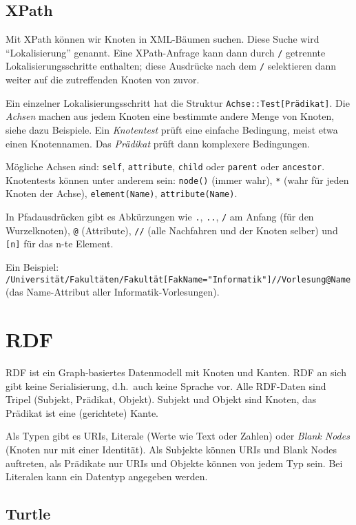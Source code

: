\documentclass[a4paper,parskip=half*,DIV=15,fontsize=11pt]{scrartcl}
\begin{document}
\subsection{XPath}

Mit XPath können wir Knoten in XML-Bäumen suchen. Diese Suche wird ``Lokalisierung'' genannt. Eine XPath-Anfrage kann dann durch \lstinline{/} getrennte Lokalisierungsschritte enthalten; diese Ausdrücke nach dem \lstinline{/} selektieren dann weiter auf die zutreffenden Knoten von zuvor.

Ein einzelner Lokalisierungsschritt hat die Struktur \lstinline{Achse::Test[Prädikat]}. Die \emph{Achsen} machen aus jedem Knoten eine bestimmte andere Menge von Knoten, siehe dazu Beispiele. Ein \emph{Knotentest} prüft eine einfache Bedingung, meist etwa einen Knotennamen. Das \emph{Prädikat} prüft dann komplexere Bedingungen.

Mögliche Achsen sind: \lstinline{self}, \lstinline{attribute}, \lstinline{child} oder \lstinline{parent} oder \lstinline{ancestor}. Knotentests können unter anderem sein: \lstinline{node()} (immer wahr), \lstinline{*} (wahr für jeden Knoten der Achse), \lstinline{element(Name)}, \lstinline{attribute(Name)}.

In Pfadausdrücken gibt es Abkürzungen wie \lstinline{.}, \lstinline{..}, \lstinline{/} am Anfang (für den Wurzelknoten), \lstinline{@} (Attribute), \lstinline{//} (alle Nachfahren und der Knoten selber) und \lstinline{[n]} für das n-te Element.

Ein Beispiel: \lstinline{/Universität/Fakultäten/Fakultät[FakName="Informatik"]//Vorlesung@Name} (das Name-Attribut aller Informatik-Vorlesungen).

\section{RDF}

RDF ist ein Graph-basiertes Datenmodell mit Knoten und Kanten. RDF an sich gibt keine Serialisierung, d.h.\ auch keine Sprache vor. Alle RDF-Daten sind Tripel (Subjekt, Prädikat, Objekt). Subjekt und Objekt sind Knoten, das Prädikat ist eine (gerichtete) Kante.

Als Typen gibt es URIs, Literale (Werte wie Text oder Zahlen) oder \emph{Blank Nodes} (Knoten nur mit einer Identität). Als Subjekte können URIs und Blank Nodes auftreten, als Prädikate nur URIs und Objekte können von jedem Typ sein. Bei Literalen kann ein Datentyp angegeben werden.

\subsection{Turtle}
\end{document}
